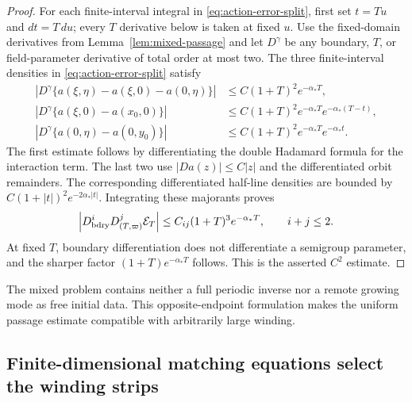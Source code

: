 \documentclass[11pt]{amsart}
\numberwithin{equation}{section}
\theoremstyle{definition}
\theoremstyle{remark}
\begin{document}
\begin{proof}
For each finite-interval integral in
\eqref{eq:action-error-split}, first set $t=Tu$ and $dt=T\,du$; every
$T$ derivative below is taken at fixed $u$.  Use the fixed-domain
derivatives from Lemma~\ref{lem:mixed-passage} and
let $D^\gamma$ be any boundary, $T$, or field-parameter derivative of
total order at most two.  The three finite-interval densities in
\eqref{eq:action-error-split} satisfy
\begin{align}
 \left|D^\gamma
 \{a(\xi,\eta)-a(\xi,0)-a(0,\eta)\}\right|
  &\le C(1+T)^2e^{-\alpha_*T},
  \label{eq:action-interaction-jets}\\
 \left|D^\gamma\{a(\xi,0)-a(x_0,0)\}\right|
  &\le C(1+T)^2e^{-\alpha_*T}
          e^{-\alpha_*(T-t)},
  \label{eq:action-unstable-jets}\\
 \left|D^\gamma\{a(0,\eta)-a(0,y_0)\}\right|
  &\le C(1+T)^2e^{-\alpha_*T}e^{-\alpha_*t}.
  \label{eq:action-stable-jets}
\end{align}
The first estimate follows by differentiating the double Hadamard formula
for the interaction term.  The last two use $|Da(z)|\le C|z|$ and the
differentiated orbit remainders.  The corresponding differentiated
half-line densities are bounded by
$C(1+|t|)^2e^{-2\alpha_*|t|}$.  Integrating these majorants proves
\begin{equation}\label{eq:action-gluing-jets}
 \left|D_{\rm bdry}^iD_{(T,\varpi)}^j\mathcal E_T\right|
 \le C_{ij}(1+T)^3e^{-\alpha_*T},\qquad i+j\le2.
\end{equation}
At fixed $T$, boundary differentiation does not differentiate a semigroup
parameter, and the sharper factor $(1+T)e^{-\alpha_*T}$ follows.  This is
the asserted $C^2$ estimate.
\end{proof}

The mixed problem contains neither a full periodic inverse nor a remote
growing mode as free initial data.  This opposite-endpoint formulation makes the
uniform passage estimate compatible with arbitrarily large winding.

\subsection{Finite-dimensional matching equations select the winding strips}
\end{document}
